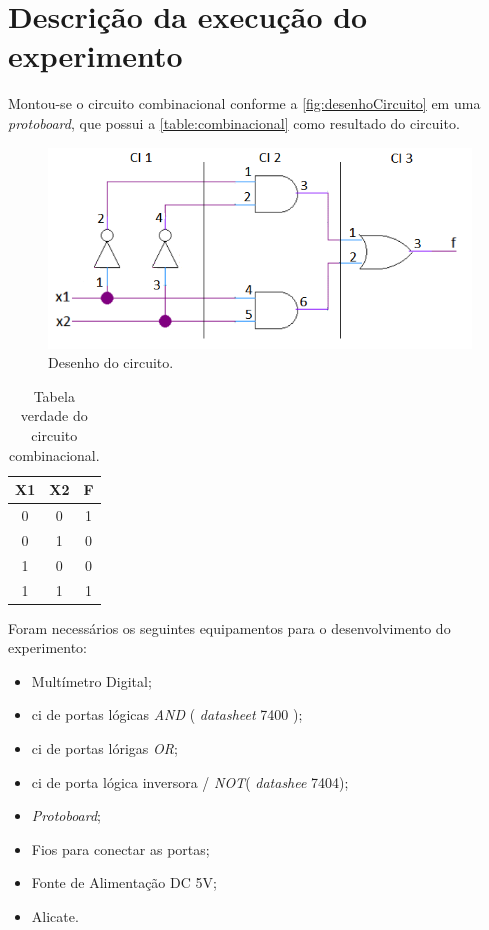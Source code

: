 
\chapter{Descrição da execução do experimento}
	Montou-se o circuito combinacional conforme a \autoref{fig:desenhoCircuito} em uma
	\textit{protoboard}, que possui a \autoref{table:combinacional} como resultado do circuito.

	\begin{figure}[H]
		\centering
		\caption{\label{fig:desenhoCircuito}Desenho do circuito.}
		\includegraphics[width=1\textwidth]{img/DesenhoCircuito}
	\end{figure}

	\begin{table}[h]
		\centering
		\caption{Tabela verdade do circuito combinacional.}
		\label{table:combinacional}
		\begin{tabular}{c|c|c}
			\textbf{X1} & \textbf{X2} & \textbf{F}\\
			\hline
			0 & 0 & 1 \\
			0 & 1 & 0 \\
			1 & 0 & 0 \\
			1 & 1 & 1 \\
		\end{tabular}
	\end{table}

	Foram necessários os seguintes equipamentos para o desenvolvimento do experimento:
	\begin{itemize}
		\item Multímetro Digital;
		\item \ac{ci} de portas lógicas \textit{AND} ( \textit{datasheet} 7400 );
		\item \ac{ci} de portas lórigas \textit{OR};
		\item \ac{ci} de porta lógica inversora / \textit{NOT}( \textit{datashee} 7404);
		\item \textit{Protoboard};
		\item Fios para conectar as portas;
		\item Fonte de Alimentação DC 5V;
		\item Alicate.
	\end{itemize}

